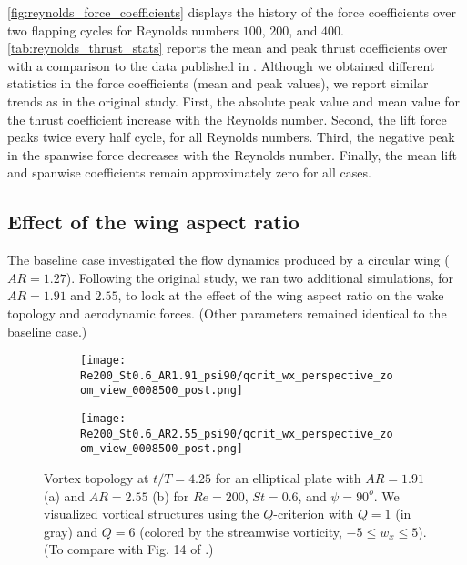 \cref{fig:reynolds_force_coefficients} displays the history of the force coefficients over two flapping cycles for Reynolds numbers $100$, $200$, and $400$.
\cref{tab:reynolds_thrust_stats} reports the mean and peak thrust coefficients over with a comparison to the data published in \citet{li_dong_2016}.
Although we obtained different statistics in the force coefficients (mean and peak values), we report similar trends as in the original study.
First, the absolute peak value and mean value for the thrust coefficient increase with the Reynolds number.
Second, the lift force peaks twice every half cycle, for all Reynolds numbers.
Third, the negative peak in the spanwise force decreases with the Reynolds number.
Finally, the mean lift and spanwise coefficients remain approximately zero for all cases.

\subsection{Effect of the wing aspect ratio}

The baseline case investigated the flow dynamics produced by a circular wing ($AR = 1.27$).
Following the original study, we ran two additional simulations, for $AR = 1.91$ and $2.55$, to look at the effect of the wing aspect ratio on the wake topology and aerodynamic forces.
(Other parameters remained identical to the baseline case.)

\begin{figure}[!h]
  \centering
  \begin{subfigure}[c]{0.45\textwidth}
    \centering
    \texttt{[image: Re200\_St0.6\_AR1.91\_psi90/qcrit\_wx\_perspective\_zoom\_view\_0008500\_post.png]}
    \caption{}
    \label{fig:ratio_wake_topology:1.91_perspective}
  \end{subfigure}
  \hfill
  \begin{subfigure}[c]{0.45\textwidth}
    \centering
    \texttt{[image: Re200\_St0.6\_AR2.55\_psi90/qcrit\_wx\_perspective\_zoom\_view\_0008500\_post.png]}
    \caption{}
    \label{fig:ratio_wake_topology:2.55_perspective}
  \end{subfigure}
  \caption{Vortex topology at $t / T = 4.25$ for an elliptical plate with $AR = 1.91$ (a) and $AR = 2.55$ (b) for $Re = 200$, $St = 0.6$, and $\psi = 90^o$. We visualized vortical structures using the $Q$-criterion with $Q = 1$ (in gray) and $Q = 6$ (colored by the streamwise vorticity, $-5 \leq w_x \leq 5$). (To compare with Fig. 14 of \citet{li_dong_2016}.)}
  \label{fig:ratio_wake_topology}
\end{figure}

